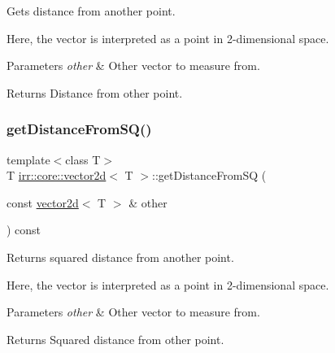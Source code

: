 Gets distance from another point. 

Here, the vector is interpreted as a point in 2-\/dimensional space. 
\begin{DoxyParams}{Parameters}
{\em other} & Other vector to measure from. \\
\hline
\end{DoxyParams}
\begin{DoxyReturn}{Returns}
Distance from other point. 
\end{DoxyReturn}
\mbox{\label{classirr_1_1core_1_1vector2d_aaf9107f38ae6a7e9bee6580440b53539}} 
\subsubsection{\texorpdfstring{get\+Distance\+From\+S\+Q()}{getDistanceFromSQ()}\hspace{0.1cm}{\footnotesize\ttfamily [1/2]}}
{\footnotesize\ttfamily template$<$class T$>$ \\
T \hyperlink{classirr_1_1core_1_1vector2d}{irr\+::core\+::vector2d}$<$ T $>$\+::get\+Distance\+From\+SQ (\begin{DoxyParamCaption}\item[{const \hyperlink{classirr_1_1core_1_1vector2d}{vector2d}$<$ T $>$ \&}]{other }\end{DoxyParamCaption}) const\hspace{0.3cm}{\ttfamily [inline]}}



Returns squared distance from another point. 

Here, the vector is interpreted as a point in 2-\/dimensional space. 
\begin{DoxyParams}{Parameters}
{\em other} & Other vector to measure from. \\
\hline
\end{DoxyParams}
\begin{DoxyReturn}{Returns}
Squared distance from other point. 
\end{DoxyReturn}
\mbox{\label{classirr_1_1core_1_1vector2d_aaf9107f38ae6a7e9bee6580440b53539}} 
